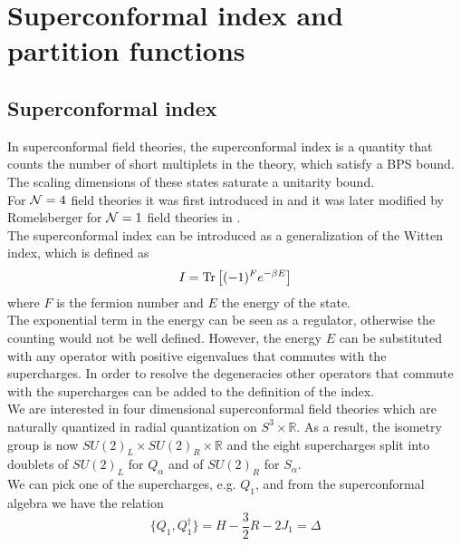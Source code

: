 

\chapter{  Superconformal index and  partition functions}



\section{Superconformal index}
In superconformal field theories, the superconformal index is a quantity that counts the number of short multiplets in the theory, which satisfy a BPS bound.
The scaling dimensions of these states saturate a unitarity bound.\\
For $\mathcal{N}=4$ field theories it was first introduced in \cite{Kinney:2005ej}
and it was later modified by Romelsberger for $\mathcal{N}=1$ field theories in \cite{Romelsberger:2005eg}.\\
The superconformal index can be introduced as a generalization of the Witten index, which is defined as 
\begin{equation}
I = \mathrm{Tr } \,{ \left[   (-1)^F e^{-\beta E}\right]}
\end{equation}
where $F$ is the fermion number and $E$ the energy of the state.\\
The exponential term in the energy can be seen as a regulator, otherwise the counting would not be well defined.
However, the energy $E$ can be substituted with any operator with positive eigenvalues that commutes with the supercharges. 
In order to resolve the degeneracies other operators that commute with the supercharges can be added to the definition of the index.
\\
We are interested in four dimensional superconformal field theories which are naturally quantized in radial quantization on $S^3 \times \mathbb{R}$. 
As a result, the isometry group is now $SU(2)_L \times SU(2)_R \times \mathbb{R}$ and the eight supercharges split into doublets of $SU(2)_L$ for $Q_{\alpha}$ and of $SU(2)_R$ for $S_{\alpha}$.\\
We can pick one of the supercharges, e.g. $Q_1$, and from the superconformal algebra we have the relation
\begin{equation}
 \{Q_1, Q_1^{\dagger} \} = H - \frac{3}{2} R - 2 J_1 = \Delta
 \end{equation} 
